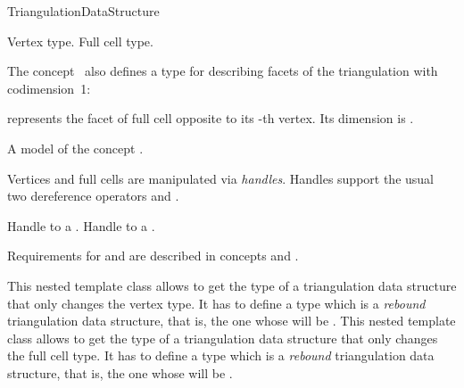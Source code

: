 \begin{ccRefConcept}{TriangulationDataStructure}
\ccHasModels


\ccTypes
{}
\ccThreeToTwo

{
Vertex type.
}
\ccGlue
{}
{
Full cell type.
}

The concept \ccRefName\ also defines a type for describing facets of the
triangulation with codimension~1:


{
 represents the facet of
full cell  opposite to its -th vertex.
 Its dimension is . 
}
\ccThreeToTwo

{A model of the concept .}

Vertices and full cells are manipulated via \emph{handles}. Handles support the
usual two dereference operators  and .

{
Handle to a .
}
\ccGlue
{}
{
Handle to a .
}


Requirements for  and  are described in concepts
 and
 .

\begin{ccAdvanced}
{This nested template class allows to get the type of a triangulation
data structure that only changes the vertex type.  It has to define a type
 which is a {\it rebound} triangulation data structure, that is, the
one whose  will be .}
\ccGlue
{}
{This nested template class allows to get the type of a triangulation
data structure that only changes the full cell type.  It has to define a type
 which is a {\it rebound} triangulation data structure, that is, the
one whose  will be .}
\end{ccAdvanced}



\end{ccRefConcept}
